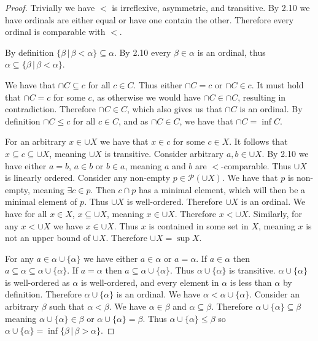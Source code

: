 \documentclass{article}
\theoremstyle{definition}
\newcommand{\powset}[1]{\mathcal{P}(#1)}
\begin{document}
\begin{proof}
    Trivially we have $<$ is irreflexive, asymmetric, and transitive. By 2.10 we have ordinals are either equal or have one contain the other. Therefore every ordinal is comparable with $<$.

    By definition $\{\beta \, | \, \beta < \alpha\} \subseteq \alpha$. By 2.10 every $\beta \in \alpha$ is an ordinal, thus $\alpha \subseteq \{\beta \, | \, \beta < \alpha\}$.

    We have that $\cap C \subseteq c$ for all $c \in C$. Thus either $\cap C = c$ or $\cap C \in c$. It must hold that $\cap C = c$ for some $c$, as otherwise we would have $\cap C \in \cap C$, resulting in contradiction. Therefore $\cap C \in C$, which also gives us that $\cap C$ is an ordinal. By definition $\cap C \le c$ for all $c \in C$, and as $\cap C \in C$, we have that $\cap C = \inf C$.

    For an arbitrary $x \in \cup X$ we have that $x \in c$ for some $c \in X$. It follows that $x \subseteq c \subseteq \cup X$, meaning $\cup X$ is transitive. Consider arbitrary $a, b \in \cup X$. By 2.10 we have either $a = b$, $a \in b$ or $b \in  a$, meaning $a$ and $b$ are $<$-comparable. Thus $\cup X$ is linearly ordered. Consider any non-empty $p \in \powset{\cup X}$. We have that $p$ is non-empty, meaning $\exists c \in p$. Then $c \cap p$ has a minimal element, which will then be a minimal element of $p$. Thus $\cup X$ is well-ordered. Therefore $\cup X$ is an ordinal. We have for all $x \in X$, $x \subseteq \cup X$, meaning $x \in \cup X$. Therefore $x < \cup X$. Similarly, for any $x < \cup X$ we have $x \in \cup X$. Thus $x$ is contained in some set in $X$, meaning $x$ is not an upper bound of $\cup X$. Therefore $\cup X = \sup X$.

    For any $a \in \alpha \cup \{\alpha\}$ we have either $a \in \alpha$ or $a = \alpha$. If $a \in \alpha$ then $a \subseteq \alpha \subseteq \alpha \cup \{\alpha\}$. If $a = \alpha$ then $a \subseteq \alpha \cup \{\alpha\}$. Thus $\alpha \cup \{\alpha\}$ is transitive. $\alpha \cup \{\alpha\}$ is well-ordered as $\alpha$ is well-ordered, and every element in $\alpha$ is less than $\alpha$ by definition. Therefore $\alpha \cup \{\alpha\}$ is an ordinal. We have $\alpha < \alpha \cup \{\alpha\}$. Consider an arbitrary $\beta$ such that $\alpha < \beta$. We have $\alpha \in \beta$ and $\alpha \subseteq \beta$. Therefore $\alpha \cup \{\alpha\} \subseteq \beta$ meaning $\alpha \cup \{\alpha\} \in \beta$ or $\alpha \cup \{\alpha\} = \beta$. Thus $\alpha \cup \{\alpha\} \le \beta$ so $\alpha \cup \{\alpha\} = \inf \{\beta \, | \, \beta > \alpha\}$.
\end{proof}
\end{document}
